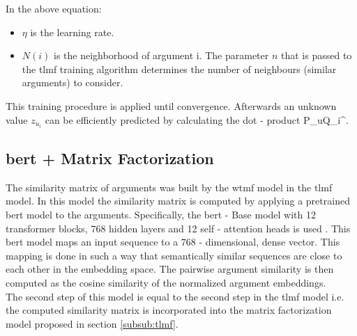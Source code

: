 In the above equation:
\begin{itemize}
    \item $\eta$ is the learning rate. 
    \item $N(i)$ is the neighborhood of argument i. The parameter $n$ that is passed to the \acrshort{tlmf} training algorithm determines the number of neighbours (similar arguments) to consider.
\end{itemize}
This training procedure is applied until convergence. Afterwards an unknown value $z_u_i$ can be efficiently predicted by calculating the dot - product P_uQ_i^\top.  

\subsection{\acrshort{bert} + Matrix Factorization}
The similarity matrix of arguments was built by the \acrshort{wtmf} model in the \acrshort{tlmf} model. In this model the similarity matrix is computed by applying a pretrained \acrshort{bert} model to the arguments. Specifically, the \acrshort{bert} - Base model with 12 transformer blocks, 768 hidden layers and 12 self - attention heads is used \cite{devlin2018bert}. This \acrshort{bert} model maps an input sequence to a $768$ - dimensional, dense vector. This mapping is done in such a way that semantically similar sequences are close to each other in the embedding space. The pairwise argument similarity is then computed as the cosine similarity of the normalized argument embeddings.\\
The second step of this model is equal to the second step in the \acrshort{tlmf} model i.e. the computed similarity matrix is incorporated into the matrix factorization model proposed in section \ref{subsub:tlmf}. 

